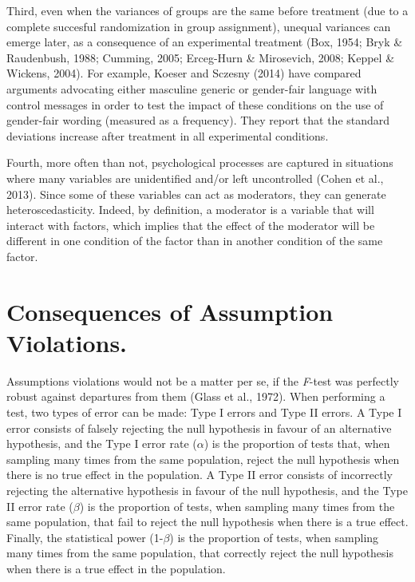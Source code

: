 \documentclass[man,floatsintext]{apa6}
\begin{document}
Third, even when the variances of groups are the same before treatment (due to a complete succesful randomization in group assignment), unequal variances can emerge later, as a consequence of an experimental treatment (Box, 1954; Bryk \& Raudenbush, 1988; Cumming, 2005; Erceg-Hurn \& Mirosevich, 2008; Keppel \& Wickens, 2004). For example, Koeser and Sczesny (2014) have compared arguments advocating either masculine generic or gender-fair language with control messages in order to test the impact of these conditions on the use of gender-fair wording (measured as a frequency). They report that the standard deviations increase after treatment in all experimental conditions.

Fourth, more often than not, psychological processes are captured in situations where many variables are unidentified and/or left uncontrolled (Cohen et al., 2013). Since some of these variables can act as moderators, they can generate heteroscedasticity. Indeed, by definition, a moderator is a variable that will interact with factors, which implies that the effect of the moderator will be different in one condition of the factor than in another condition of the same factor.

\hypertarget{consequences-of-assumption-violations.}{%
\section{Consequences of Assumption Violations.}\label{consequences-of-assumption-violations.}}

Assumptions violations would not be a matter per se, if the \emph{F}-test was perfectly robust against departures from them (Glass et al., 1972). When performing a test, two types of error can be made: Type I errors and Type II errors. A Type I error consists of falsely rejecting the null hypothesis in favour of an alternative hypothesis, and the Type I error rate (\(\alpha\)) is the proportion of tests that, when sampling many times from the same population, reject the null hypothesis when there is no true effect in the population. A Type II error consists of incorrectly rejecting the alternative hypothesis in favour of the null hypothesis, and the Type II error rate (\(\beta\)) is the proportion of tests, when sampling many times from the same population, that fail to reject the null hypothesis when there is a true effect. Finally, the statistical power (1-\(\beta\)) is the proportion of tests, when sampling many times from the same population, that correctly reject the null hypothesis when there is a true effect in the population.
\end{document}
